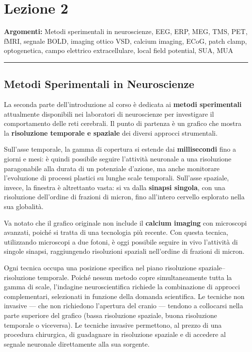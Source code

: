 \chapter{Lezione 2}

\textbf{Argomenti:} Metodi sperimentali in neuroscienze, EEG, ERP, MEG, TMS, PET, fMRI, segnale BOLD, imaging ottico VSD, calcium imaging, ECoG, patch clamp, optogenetica, campo elettrico extracellulare, local field potential, SUA, MUA

\vspace{0.5cm}
\noindent\rule{\textwidth}{0.4pt}

\section{Metodi Sperimentali in Neuroscienze}


La seconda parte dell'introduzione al corso è dedicata ai \textbf{metodi sperimentali} attualmente disponibili nei laboratori di neuroscienze per investigare il comportamento delle reti cerebrali. Il punto di partenza è un grafico che mostra la \textbf{risoluzione temporale e spaziale} dei diversi approcci strumentali.

Sull'asse temporale, la gamma di copertura si estende dai \textbf{millisecondi} fino a giorni e mesi: è quindi possibile seguire l'attività neuronale a una risoluzione paragonabile alla durata di un potenziale d'azione, ma anche monitorare l'evoluzione di processi plastici su lunghe scale temporali. Sull'asse spaziale, invece, la finestra è altrettanto vasta: si va dalla \textbf{sinapsi singola}, con una risoluzione dell'ordine di frazioni di micron, fino all'intero cervello esplorato nella sua globalità.

Va notato che il grafico originale non include il \textbf{calcium imaging} con microscopi avanzati, poiché si tratta di una tecnologia più recente. Con questa tecnica, utilizzando microscopi a due fotoni, è oggi possibile seguire in vivo l'attività di singole sinapsi, raggiungendo risoluzioni spaziali nell'ordine di frazioni di micron.


Ogni tecnica occupa una posizione specifica nel piano risoluzione spaziale–risoluzione temporale. Poiché nessun metodo copre simultaneamente tutta la gamma di scale, l'indagine neuroscientifica richiede la combinazione di approcci complementari, selezionati in funzione della domanda scientifica. Le tecniche non invasive — che non richiedono l'apertura del cranio — tendono a collocarsi nella parte superiore del grafico (bassa risoluzione spaziale, buona risoluzione temporale o viceversa). Le tecniche invasive permettono, al prezzo di una procedura chirurgica, di guadagnare in risoluzione spaziale e di accedere al segnale neuronale direttamente alla sua sorgente.


